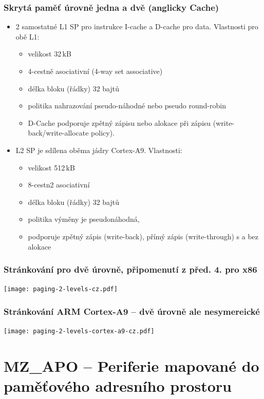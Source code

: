 \documentclass{beamer}
\begin{document}
\begin{frame}
\frametitle{Skrytá paměť úrovně jedna a dvě (anglicky Cache)}
\begin{itemize}
 \item 2 samostatné L1 SP pro instrukce I-cache a D-cache pro data. Vlastnosti pro obě L1:
 \begin{itemize}
  \item velikost 32\,kB
  \item 4-cestně asociativní (4-way set associative)
  \item délka bloku (řádky) 32 bajtů
  \item politika nahrazování pseudo-náhodné nebo pseudo round-robin
  \item D-Cache podporuje zpětný zápisu nebo alokace při zápisu (write-back/write-allocate policy).
 \end{itemize}
 \item L2 SP je sdílena oběma jádry Cortex-A9. Vlastnosti:
 \begin{itemize}
   \item velikost 512\,kB
   \item 8-cestn2 asociativní
   \item délka bloku (řádky) 32 bajtů
   \item politika výměny je pseudonáhodná,
   \item  podporuje zpětný zápis (write-back), přímý zápis (write-through) s a bez alokace
 \end{itemize}
\end{itemize}

\end{frame}

\begin{frame}
\frametitle{Stránkování pro dvě úrovně, připomenutí z před. 4. pro x86}

\texttt{[image: paging-2-levels-cz.pdf]}

\end{frame}

\begin{frame}
\frametitle{Stránkování ARM Cortex-A9 -- dvě úrovně ale nesymereické}

\texttt{[image: paging-2-levels-cortex-a9-cz.pdf]}

\end{frame}

\section{MZ\_APO -- Periferie mapované do paměťového adresního prostoru}
\end{document}
